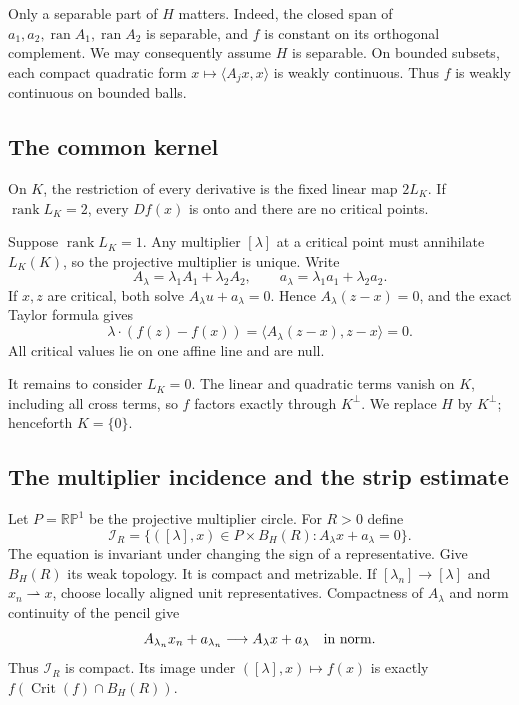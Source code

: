 \documentclass[11pt]{article}
\newcommand{\Pj}{\mathbb{RP}^{1}}
\newcommand{\Crit}{\operatorname{Crit}}
\newcommand{\rank}{\operatorname{rank}}
\begin{document}
Only a separable part of $H$ matters. Indeed, the closed span of
$a_1,a_2,\operatorname{ran}A_1,\operatorname{ran}A_2$ is separable, and $f$ is
constant on its orthogonal complement. We may consequently assume $H$ is
separable. On bounded subsets, each compact quadratic form
$x\mapsto\langle A_jx,x\rangle$ is weakly continuous. Thus $f$ is weakly
continuous on bounded balls.

\subsection{The common kernel}

On $K$, the restriction of every derivative is the fixed linear map $2L_K$.
If $\rank L_K=2$, every $Df(x)$ is onto and there are no critical points.

Suppose $\rank L_K=1$. Any multiplier $[\lambda]$ at a critical point must
annihilate $L_K(K)$, so the projective multiplier is unique. Write
\[
 A_\lambda=\lambda_1A_1+\lambda_2A_2,
 \qquad a_\lambda=\lambda_1a_1+\lambda_2a_2.
\]
If $x,z$ are critical, both solve $A_\lambda u+a_\lambda=0$. Hence
$A_\lambda(z-x)=0$, and the exact Taylor formula gives
\[
 \lambda\cdot(f(z)-f(x))
 =\langle A_\lambda(z-x),z-x\rangle=0.
\]
All critical values lie on one affine line and are null.

It remains to consider $L_K=0$. The linear and quadratic terms vanish on $K$,
including all cross terms, so $f$ factors exactly through $K^\perp$. We replace
$H$ by $K^\perp$; henceforth $K=\{0\}$.

\subsection{The multiplier incidence and the strip estimate}

Let $P=\Pj$ be the projective multiplier circle. For $R>0$ define
\[
 \mathcal I_R=
 \{([\lambda],x)\in P\times B_H(R):A_\lambda x+a_\lambda=0\}.
\]
The equation is invariant under changing the sign of a representative.
Give $B_H(R)$ its weak topology. It is compact and metrizable. If
$[\lambda_n]\to[\lambda]$ and $x_n\rightharpoonup x$, choose locally aligned
unit representatives. Compactness of $A_\lambda$ and norm continuity of the
pencil give
\[
 A_{\lambda_n}x_n+a_{\lambda_n}\longrightarrow A_\lambda x+a_\lambda
 \quad\hbox{in norm}.
\]
Thus $\mathcal I_R$ is compact. Its image under $([\lambda],x)\mapsto f(x)$
is exactly $f(\Crit(f)\cap B_H(R))$.
\end{document}
